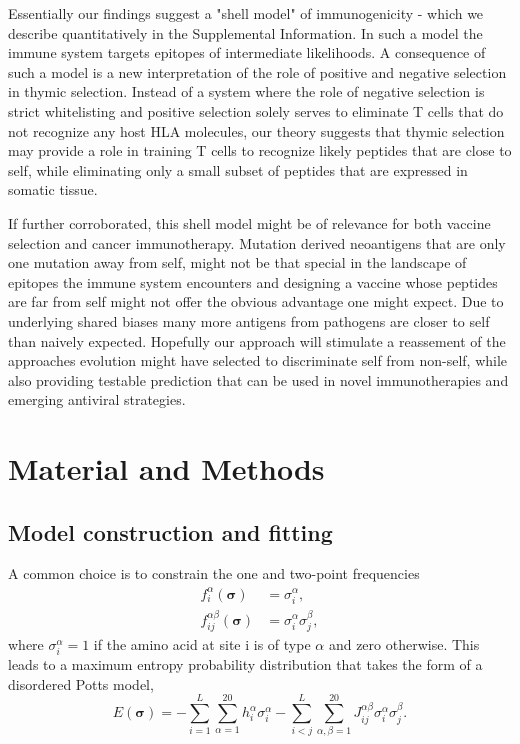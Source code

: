 \documentclass[superscriptaddress,twocolumn,pre]{revtex4}
\newcommand{\B}{\boldsymbol}
\newcommand{\<}{\langle}
\renewcommand{\>}{\rangle}
\begin{document}
Essentially our findings suggest a "shell model" of immunogenicity - which we describe quantitatively in the Supplemental Information. In such a model the immune system targets epitopes of intermediate likelihoods. A consequence of such a model is a new interpretation of the role of positive and negative selection in thymic selection. Instead of a system where the role of negative selection is strict whitelisting and positive selection solely serves to eliminate T cells that do not recognize any host HLA molecules, our theory suggests that thymic selection may provide a role in training T cells to recognize likely peptides that are close to self, while eliminating only a small subset of peptides that are expressed in somatic tissue.

If further corroborated, this shell model might be of relevance for both vaccine selection and cancer immunotherapy. Mutation derived neoantigens that are only one mutation away from self, might not be that special in the landscape of epitopes the immune system encounters and designing a vaccine whose peptides are far from self might not offer the obvious advantage one might expect. Due to underlying shared biases many more antigens from pathogens are closer to self than naively expected. Hopefully our approach will stimulate a reassement of the approaches evolution might have selected to discriminate self from non-self, while also providing testable prediction that can be used in novel immunotherapies and emerging antiviral strategies.


\section{Material and Methods}

\subsection{Model construction and fitting}

A common choice is to constrain the one and two-point frequencies
\begin{align}
    f_i^\alpha(\B \sigma) &= \sigma_i^\alpha, \\
    f_{ij}^{\alpha\beta}(\B \sigma) &= \sigma_i^\alpha \sigma_j^\beta,
\end{align}
where $\sigma_i^\alpha = 1$ if the amino acid at site i is of type $\alpha$ and zero otherwise.
This leads to a maximum entropy probability distribution that takes the form of a disordered Potts model,
\begin{equation}
    E(\boldsymbol \sigma) = - \sum_{i=1}^L \sum_{\alpha = 1}^{20} h_i^\alpha \sigma_i^\alpha - \sum_{i<j}^L \sum_{\alpha,\beta = 1}^{20} J_{ij}^{\alpha \beta}  \sigma_i^\alpha \sigma_j^\beta.
\end{equation}
\end{document}
